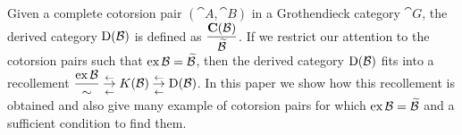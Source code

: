 
Given a complete cotorsion pair $(\cat{A},\cat{B})$ in a Grothendieck category $\cat{G}$,
the derived category $\mathrm{D}(\mathcal{B})$ is defined as $\dfrac{\mathbf{C}(\mathcal{B})}{\mathcal{\widetilde{\mathcal{B}}}}$.
If we restrict our attention to the cotorsion pairs such that $\text{ex}\,\mathcal{B}=\mathcal{\widetilde{\mathcal{B}}}$,
then the derived category $\mathrm{D}(\mathcal{B})$ fits into a recollement
$\displaystyle\frac{\text{ex}\,\mathcal{B}}{\sim} \underset{\leftarrow}{\overset{\leftarrow}\to} K(\mathcal{B}) \underset{\leftarrow}{\overset{\leftarrow}\to} \mathrm{D}(\mathcal{B})$.
In this paper we show how this recollement is obtained and also give many example of
cotorsion pairs for which $\text{ex}\,\mathcal{B}=\mathcal{\widetilde{\mathcal{B}}}$ and a sufficient condition to find them.
